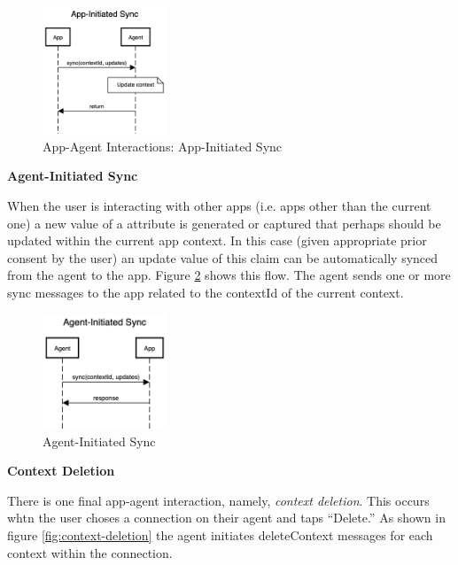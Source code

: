 \documentclass[11pt, oneside]{article}   	%
\begin{document}
\begin{figure}[htbp]
	\centering
	\includegraphics[width=0.33\textwidth]{./images/int-app-initiated_sync.png}
	\caption{App-Agent Interactions: App-Initiated Sync}
	\label{fig:app-initiated_sync}
\end{figure}

\textbf{Agent-Initiated Sync}

When the user is interacting with other apps (i.e. apps other than the current one) a new value of a attribute is generated or captured that perhaps should be updated within the current app context. In this case (given appropriate prior consent by the user) an update value of this claim can be automatically synced from the agent to the app. Figure \ref{fig:agent-initiated_sync} shows this flow. The agent sends one or more sync messages to the app related to the contextId of the current context.

\begin{figure}[htbp]
	\centering
	\includegraphics[width=0.33\textwidth]{./images/int-agent-initiated_sync.png}
	\caption{Agent-Initiated Sync}
	\label{fig:agent-initiated_sync}
\end{figure}

\textbf{Context Deletion}

There is one final app-agent interaction, namely, \emph{context deletion}. This occurs whtn the user choses a connection on their agent and taps ``Delete.'' As shown in figure \ref{fig:context-deletion}
the agent initiates deleteContext messages for each context within the connection.
\end{document}
